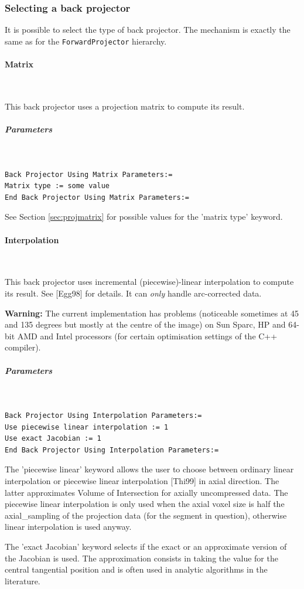 \documentclass{article}
\newcommand{\subsubsubsection}[1]{\paragraph{#1}\mbox{} \\}
\newcommand{\subsubsubsubsection}[1]{\subparagraph{#1} \mbox{} \\}
\begin{document}
{{\subsubsection{
Selecting a back projector}
\label{sec:backprojectors}
It is possible to select the type of back projector. The mechanism 
is exactly the same as for the \texttt{ForwardProjector} hierarchy.

{ \subsubsubsection{Matrix}
}
This back projector uses a projection matrix to compute its result.

{ \subsubsubsubsection{Parameters}
}
\begin{verbatim}
Back Projector Using Matrix Parameters:=
Matrix type := some value
End Back Projector Using Matrix Parameters:=
\end{verbatim}

See Section \ref{sec:projmatrix} for possible values for the 'matrix type' keyword.

{ \subsubsubsection{Interpolation}
}
\label{sec:IncrementalInterpolationBackProjector}
This back projector uses incremental (piecewise)-linear interpolation 
to compute its result. See [Egg98] for details. It can \textit{only} handle arc-corrected data.


\textbf{Warning:} The current implementation has problems (noticeable 
sometimes at 45 and 135 degrees but mostly at the centre of the image) on Sun 
Sparc, HP and 64-bit AMD and Intel processors (for certain optimisation settings
of the C++ compiler).

{ \subsubsubsubsection{Parameters}
}
\begin{verbatim}
Back Projector Using Interpolation Parameters:=
Use piecewise linear interpolation := 1
Use exact Jacobian := 1
End Back Projector Using Interpolation Parameters:=
\end{verbatim}

The 'piecewise linear' keyword allows the user to choose between 
ordinary linear interpolation or piecewise linear interpolation 
[Thi99] in axial direction. The latter approximates Volume of 
Intersection for axially uncompressed data. The piecewise linear 
interpolation is only used when the axial voxel size is half 
the axial\_sampling of the projection data (for the segment in 
question), otherwise linear interpolation is used anyway.


The 'exact Jacobian' keyword selects if the exact or an approximate 
version of the Jacobian is used. The approximation consists in 
taking the value for the central tangential position and is often 
used in analytic algorithms in the literature.


}}
\end{document}
